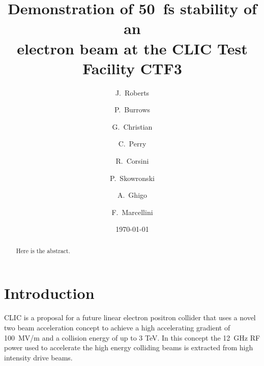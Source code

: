 \documentclass[%
 reprint,
 amsmath,amssymb,
 aps,
]{revtex4-1}
\begin{document}

\title{Demonstration of 50~fs stability of an \\ electron beam at the CLIC Test 
Facility CTF3}

\author{J.~Roberts}
\author{P.~Burrows}
\author{G.~Christian}
\author{C.~Perry}

\author{R.~Corsini}
\author{P.~Skowronski}

\author{A.~Ghigo}
\author{F.~Marcellini}

\date{\today}

\begin{abstract}
Here is the abstract.
\end{abstract}

\maketitle


\section{\label{s:intro}Introduction}

CLIC is a proposal for a future linear electron positron collider that uses a 
novel two 
beam acceleration concept to achieve a high accelerating gradient of 100~MV/m 
and a collision energy of up to 3 TeV. In this concept the 12~GHz RF power used 
to accelerate the high energy colliding beams is extracted from high intensity 
drive beams.
\end{document}
